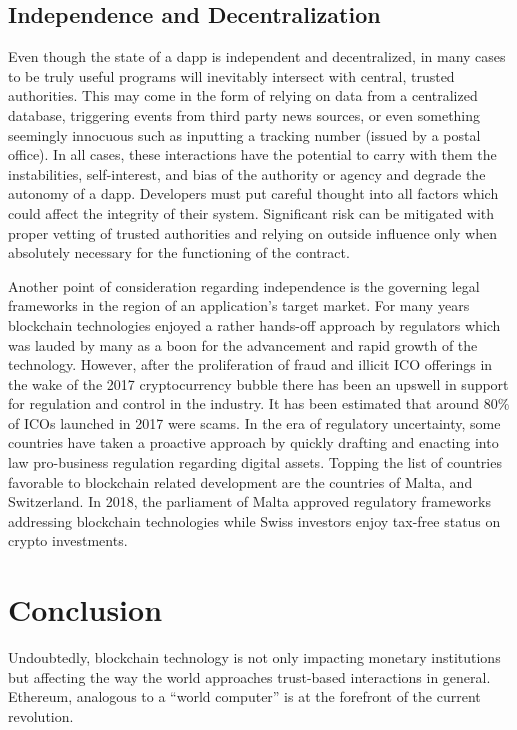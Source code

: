 \subsection{Independence and Decentralization}

Even though the state of a \ac{dapp} is independent and decentralized, in many cases to
be truly useful programs will inevitably intersect with central, trusted authorities. This
may come in the form of relying on data from a centralized database, triggering events from
third party news sources, or even something seemingly innocuous such as inputting a tracking
number (issued by a postal office). In all cases, these interactions have the potential to carry
with them the instabilities, self-interest, and bias of the authority or agency and degrade
the autonomy of a \ac{dapp}. Developers must put careful thought into all factors which could
affect the integrity of their system. Significant risk can be mitigated with proper vetting
of trusted authorities and relying on outside influence only when absolutely necessary for the
functioning of the contract.

Another point of consideration regarding independence is the governing legal frameworks in the
region of an application's target market. For many years blockchain technologies enjoyed a rather
hands-off approach by regulators which was lauded by many as a boon for the advancement and rapid
growth of the technology.\cite{RegulatoryIssues} However, after the proliferation of fraud and
illicit ICO offerings in the wake of the 2017 cryptocurrency bubble there has been an upswell in
support for regulation and control in the industry. It has been estimated that around 80\% of ICOs
launched in 2017 were scams.\cite{ICOScams} In the era of regulatory uncertainty, some countries
have taken a proactive approach by quickly drafting and enacting into law pro-business regulation
regarding digital assets. Topping the list of countries favorable to blockchain related development
are the countries of Malta, and Switzerland. In 2018, the parliament of Malta approved regulatory
frameworks addressing blockchain technologies while Swiss investors enjoy tax-free status on crypto
investments.\cite{BlockchainCountries}

\section{Conclusion}

Undoubtedly, blockchain technology is not only impacting monetary institutions but affecting
the way the world approaches trust-based interactions in general. Ethereum, analogous to a
``world computer'' is at the forefront of the current revolution.

